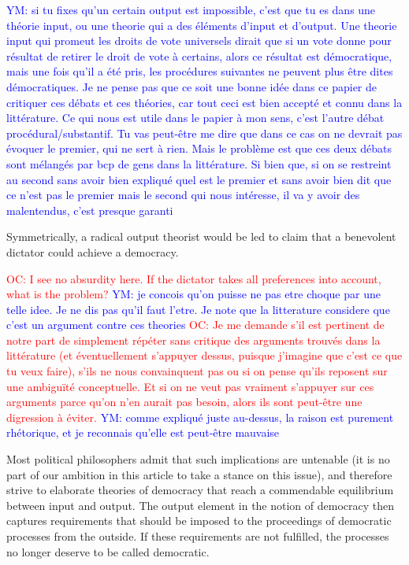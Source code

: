 \documentclass[preprint, french, english, 11pt]{elsarticle}%
\newcommand{\commentYM}[1]{\textcolor{blue}{YM: #1}}
\newcommand{\commentOC}[1]{\textcolor{red}{OC: #1}}
\begin{document}
\commentYM{si tu fixes qu'un certain output est impossible, c'est que tu es dans une théorie input, ou une theorie qui a des éléments d'input et d'output. Une theorie input qui promeut les droits de vote universels dirait que si un vote donne pour résultat de retirer le droit de vote à certains, alors ce résultat est démocratique, mais une fois qu'il a été pris, les procédures suivantes ne peuvent plus être dites démocratiques. Je ne pense pas que ce soit une bonne idée dans ce papier de critiquer ces débats et ces théories, car tout ceci est bien accepté et connu dans la littérature. Ce qui nous est utile dans le papier à mon sens, c'est l'autre débat procédural/substantif. Tu vas peut-être me dire que dans ce cas on ne devrait pas évoquer le premier, qui ne sert à rien. Mais le problème est que ces deux débats sont mélangés par bcp de gens dans la littérature. Si bien que, si on se restreint au second sans avoir bien expliqué quel est le premier et sans avoir bien dit que ce n'est pas le premier mais le second qui nous intéresse, il va y avoir des malentendus, c'est presque garanti}

Symmetrically, a radical output theorist would be led to claim that a benevolent dictator could achieve a democracy. 

\commentOC{ I see no absurdity here. If the
dictator takes all preferences into account, what is the
problem?} 
\commentYM{je concois qu'on puisse ne pas etre choque par une telle idee. Je ne dis pas qu'il faut l'etre. Je note que la litterature considere que c'est un argument contre ces theories}
\commentOC{Je me demande s’il est pertinent de notre part de simplement répéter sans critique des arguments trouvés dans la littérature (et éventuellement s’appuyer dessus, puisque j’imagine que c’est ce que tu veux faire), s’ils ne nous convainquent pas ou si on pense qu’ils reposent sur une ambiguïté conceptuelle. Et si on ne veut pas vraiment s’appuyer sur ces arguments parce qu’on n’en aurait pas besoin, alors ils sont peut-être une digression à éviter.} \commentYM{comme expliqué juste au-dessus, la raison est purement rhétorique, et je reconnais qu'elle est peut-être mauvaise}

Most political philosophers admit that such implications are untenable (it is no part of our ambition in this article to take a stance on this issue), and therefore strive to elaborate theories of democracy that reach a commendable equilibrium between input and output. The output element in the notion of democracy then captures requirements that should be imposed to the proceedings of democratic processes from the outside. If these requirements are not fulfilled, the processes no longer deserve to be called democratic. %
\end{document}
